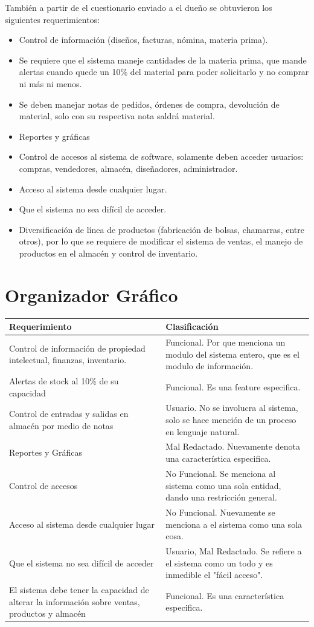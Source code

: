 \documentclass[spanish,12pt,letterpapper]{article}
\begin{document}
	También a partir de el cuestionario enviado a el dueño se obtuvieron los siguientes requerimientos:
	
	\begin{itemize}
	\item Control de información (diseños, facturas, nómina, materia prima).
	\item Se requiere que el sistema maneje cantidades de la materia prima, que mande alertas cuando quede un 10\% del material para poder solicitarlo y no comprar ni más ni menos.
	\item Se deben manejar notas de pedidos, órdenes de compra, devolución de material, solo con su respectiva nota saldrá material.
	\item Reportes y gráficas
	\item Control de accesos al sistema de software, solamente deben acceder usuarios: compras, vendedores, almacén, diseñadores, administrador.
	\item Acceso al sistema desde cualquier lugar.
	\item Que el sistema no sea difícil de acceder.
	\item Diversificación de línea de productos (fabricación de bolsas, chamarras, entre otros), por lo que se requiere de modificar el sistema de ventas, el manejo de productos en el almacén y control de inventario.
	\end{itemize}
	
	\section{Organizador Gráfico}
	
	\begin{tabular}{|p{5cm}|p{7cm}|}
	\hline
	\textbf{Requerimiento} & Clasificación\\
	\hline
	Control de información de propiedad intelectual, finanzas, inventario. & Funcional. Por que menciona un modulo del sistema entero, que es el modulo de información.  \\
	\hline
	Alertas de stock al 10\% de su capacidad & Funcional. Es una feature especifica.\\
	\hline
	Control de entradas y salidas en almacén por medio de notas & Usuario. No se involucra al sistema, solo se hace mención de un proceso en lenguaje natural.\\
	\hline
	Reportes y Gráficas & Mal Redactado. Nuevamente denota una característica especifica.\\
	\hline
	Control de accesos & No Funcional. Se menciona al sistema como una sola entidad, dando una restricción general.\\
	\hline
	Acceso al sistema desde cualquier lugar & No Funcional. Nuevamente se menciona a el sistema como una sola cosa.\\
	\hline
	Que el sistema no sea difícil de acceder & Usuario, Mal Redactado. Se refiere a el sistema como un todo y es inmedible el "fácil acceso".\\
	\hline
	El sistema debe tener la capacidad de alterar la información sobre ventas, productos y almacén & Funcional. Es una característica especifica. \\
	\hline
\end{tabular}	  
	
\end{document}

